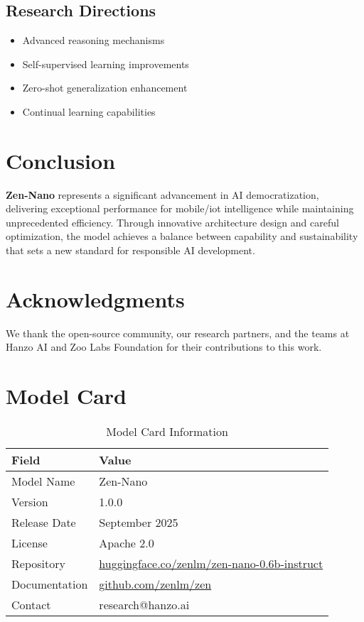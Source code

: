 \documentclass[11pt,a4paper]{article}
\begin{document}
\subsection{Research Directions}
\begin{itemize}
    \item Advanced reasoning mechanisms
    \item Self-supervised learning improvements
    \item Zero-shot generalization enhancement
    \item Continual learning capabilities
\end{itemize}

\section{Conclusion}

\textbf{Zen-Nano} represents a significant advancement in AI democratization, 
delivering exceptional performance for mobile/iot intelligence while maintaining 
unprecedented efficiency. Through innovative architecture design and careful optimization, 
the model achieves a balance between capability and sustainability that sets a new standard 
for responsible AI development.

\section*{Acknowledgments}

We thank the open-source community, our research partners, and the teams at Hanzo AI and 
Zoo Labs Foundation for their contributions to this work.




\appendix

\section{Model Card}

\begin{table}[H]
\centering
\begin{tabular}{ll}
\toprule
\textbf{Field} & \textbf{Value} \\
\midrule
Model Name & Zen-Nano \\
Version & 1.0.0 \\
Release Date & September 2025 \\
License & Apache 2.0 \\
Repository & \href{https://huggingface.co/zenlm/zen-nano-0.6b-instruct}{huggingface.co/zenlm/zen-nano-0.6b-instruct} \\
Documentation & \href{https://github.com/zenlm/zen}{github.com/zenlm/zen} \\
Contact & research@hanzo.ai \\
\bottomrule
\end{tabular}
\caption{Model Card Information}
\end{table}
\end{document}
